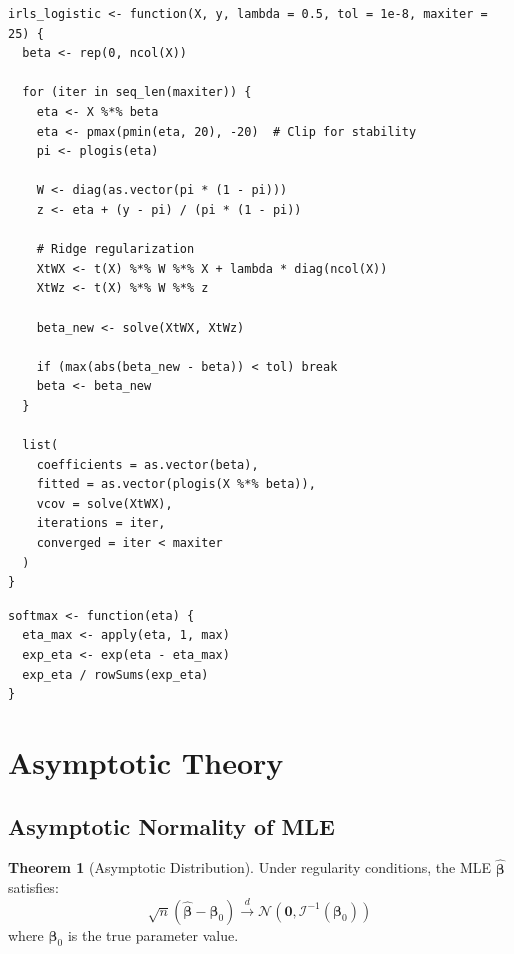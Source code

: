\documentclass[11pt,letterpaper]{article}
\theoremstyle{definition}
\newtheorem{theorem}{Theorem}[section]
\newcommand{\bb}{\boldsymbol{\beta}}
\newcommand{\I}{\mathcal{I}}
\begin{document}
\begin{lstlisting}[caption={Core IRLS for Binary Logistic Regression}]
irls_logistic <- function(X, y, lambda = 0.5, tol = 1e-8, maxiter = 25) {
  beta <- rep(0, ncol(X))
  
  for (iter in seq_len(maxiter)) {
    eta <- X %*% beta
    eta <- pmax(pmin(eta, 20), -20)  # Clip for stability
    pi <- plogis(eta)
    
    W <- diag(as.vector(pi * (1 - pi)))
    z <- eta + (y - pi) / (pi * (1 - pi))
    
    # Ridge regularization
    XtWX <- t(X) %*% W %*% X + lambda * diag(ncol(X))
    XtWz <- t(X) %*% W %*% z
    
    beta_new <- solve(XtWX, XtWz)
    
    if (max(abs(beta_new - beta)) < tol) break
    beta <- beta_new
  }
  
  list(
    coefficients = as.vector(beta),
    fitted = as.vector(plogis(X %*% beta)),
    vcov = solve(XtWX),
    iterations = iter,
    converged = iter < maxiter
  )
}
\end{lstlisting}

\begin{lstlisting}[caption={Numerically Stable Softmax}]
softmax <- function(eta) {
  eta_max <- apply(eta, 1, max)
  exp_eta <- exp(eta - eta_max)
  exp_eta / rowSums(exp_eta)
}
\end{lstlisting}

\section{Asymptotic Theory}

\subsection{Asymptotic Normality of MLE}

\begin{theorem}[Asymptotic Distribution]
Under regularity conditions, the MLE $\hat{\bb}$ satisfies:
\begin{equation}
    \sqrt{n}(\hat{\bb} - \bb_0) \xrightarrow{d} \mathcal{N}\left(\mathbf{0}, \I^{-1}(\bb_0)\right)
\end{equation}
where $\bb_0$ is the true parameter value.
\end{theorem}
\end{document}
